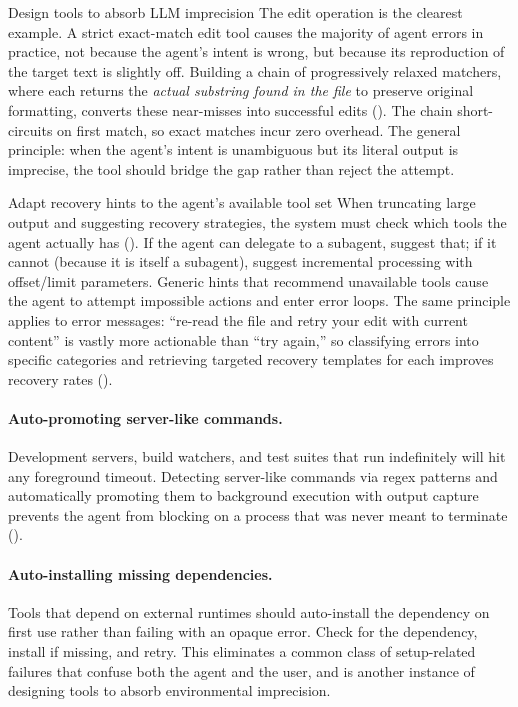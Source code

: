 \begin{lessonbox}{Design tools to absorb LLM imprecision}
The edit operation is the clearest example. A strict exact-match edit tool causes the majority of agent errors in practice, not because the agent's intent is wrong, but because its reproduction of the target text is slightly off. Building a chain of progressively relaxed matchers, where each returns the \emph{actual substring found in the file} to preserve original formatting, converts these near-misses into successful edits (). The chain short-circuits on first match, so exact matches incur zero overhead. The general principle: when the agent's intent is unambiguous but its literal output is imprecise, the tool should bridge the gap rather than reject the attempt.
\end{lessonbox}

\begin{lessonbox}{Adapt recovery hints to the agent's available tool set}
When truncating large output and suggesting recovery strategies, the system must check which tools the agent actually has (). If the agent can delegate to a subagent, suggest that; if it cannot (because it is itself a subagent), suggest incremental processing with offset/limit parameters. Generic hints that recommend unavailable tools cause the agent to attempt impossible actions and enter error loops. The same principle applies to error messages: ``re-read the file and retry your edit with current content'' is vastly more actionable than ``try again,'' so classifying errors into specific categories and retrieving targeted recovery templates for each improves recovery rates ().
\end{lessonbox}

\paragraph{Auto-promoting server-like commands.} Development servers, build watchers, and test suites that run indefinitely will hit any foreground timeout. Detecting server-like commands via regex patterns and automatically promoting them to background execution with output capture prevents the agent from blocking on a process that was never meant to terminate ().

\paragraph{Auto-installing missing dependencies.} Tools that depend on external runtimes should auto-install the dependency on first use rather than failing with an opaque error. Check for the dependency, install if missing, and retry. This eliminates a common class of setup-related failures that confuse both the agent and the user, and is another instance of designing tools to absorb environmental imprecision.

